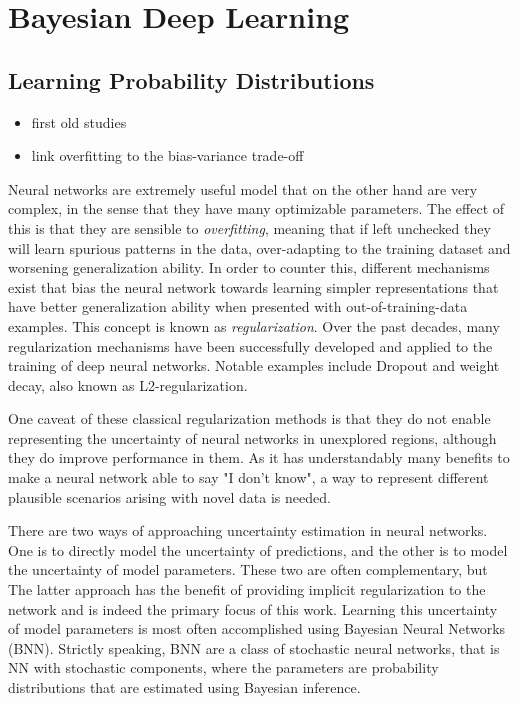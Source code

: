\section{Bayesian Deep Learning}

\subsection{Learning Probability Distributions}
\begin{itemize}
	\item first old studies
	\item link overfitting to the bias-variance trade-off
\end{itemize}

	Neural networks are extremely useful model that on the other hand are very complex, in the sense that they have many optimizable parameters. The effect of this is that they are sensible to \textit{overfitting}, meaning that if left unchecked they will learn spurious patterns in the data, over-adapting to the training dataset and worsening generalization ability. In order to counter this, different mechanisms exist that bias the neural network towards learning simpler representations that have better generalization ability when presented with out-of-training-data examples. This concept is known as \textit{regularization}. Over the past decades, many regularization mechanisms have been successfully developed and applied to the training of deep neural networks. Notable examples include Dropout and weight decay, also known as L2-regularization.  
	
	One caveat of these classical regularization methods is that they do not enable representing the uncertainty of neural networks in unexplored regions, although they do improve performance in them. As it has understandably many benefits to make a neural network able to say "I don't know", a way to represent different plausible scenarios arising with novel data is needed. 
	
	There are two ways of approaching uncertainty estimation in neural networks. One is to directly model the uncertainty of predictions, and the other is to model the uncertainty of model parameters. These two are often complementary, but The latter approach has the benefit of providing implicit regularization to the network and is indeed the primary focus of this work. Learning this uncertainty of model parameters is most often accomplished using Bayesian Neural Networks (BNN). Strictly speaking, BNN are a class of stochastic neural networks, that is NN with stochastic components, where the parameters are probability distributions that are estimated using Bayesian inference.
	

